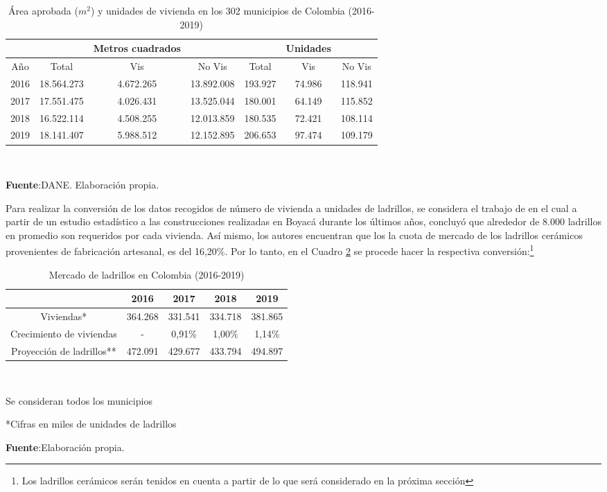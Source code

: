 \documentclass[12pt]{article}
\begin{document}
\begin{table}[H]
\centering
\caption{Área aprobada ($m^2$) y unidades de vivienda en los 302 municipios de Colombia (2016-2019)} 
\begin{tabular}{ c | c c c | c c c }
\hline
&       & \multicolumn{1}{l}{Metros cuadrados} &       &       & \multicolumn{1}{l}{Unidades}  &  \\
\hline
\hline
Año   &Total & Vis & No Vis &Total & Vis & No Vis\\
\hline
2016  & 18.564.273 & 4.672.265 & 13.892.008 & 193.927 & 74.986 & 118.941 \\
2017  & 17.551.475 & 4.026.431 & 13.525.044 & 180.001 & 64.149 & 115.852 \\
2018  & 16.522.114 & 4.508.255 & 12.013.859 & 180.535 & 72.421 & 108.114 \\
2019  & 18.141.407 & 5.988.512 & 12.152.895 & 206.653 & 97.474 & 109.179 \\
\hline
\end{tabular}%
\\
\raggedright  \scriptsize \textbf{Fuente}:DANE. Elaboración propia.
\label{c2}%
\end{table}%
Para realizar la conversión de los datos recogidos de número de vivienda a unidades de ladrillos, se considera el trabajo de \cite{buitrago2013estudio} en el cual a partir de un estudio estadístico  a las construcciones realizadas en Boyacá durante los últimos años, concluyó que alrededor de 8.000 ladrillos en promedio son requeridos por cada vivienda. Así mismo, los autores encuentran que los la cuota de mercado de los ladrillos cerámicos provenientes de fabricación artesanal, es del 16,20\%. Por lo tanto, en el Cuadro \ref{c3} se procede hacer la respectiva conversión:\footnote{Los ladrillos cerámicos serán tenidos en cuenta a partir de lo que será considerado en la próxima sección} 
\begin{table}[H]
  \centering
  \caption{Mercado de ladrillos en Colombia (2016-2019)}
    \begin{tabular}{c c c c c}
    \hline
          & 2016  & 2017  & 2018  & 2019 \\
          \hline
          \hline
    Viviendas* & 364.268 & 331.541 & 334.718 & 381.865 \\
    Crecimiento de viviendas &   -    & 0,91\% & 1,00\% & 1,14\% \\
    Proyección de ladrillos** & 472.091 & 429.677 & 433.794 & 494.897 \\
\hline
    \end{tabular} \\
    \raggedright  \scriptsize *Se consideran todos los municipios\\
    \raggedright  \scriptsize **Cifras en miles de unidades de ladrillos\\
\raggedright  \scriptsize \textbf{Fuente}:Elaboración propia.
\label{c3}%
\end{table}%
\end{document}
